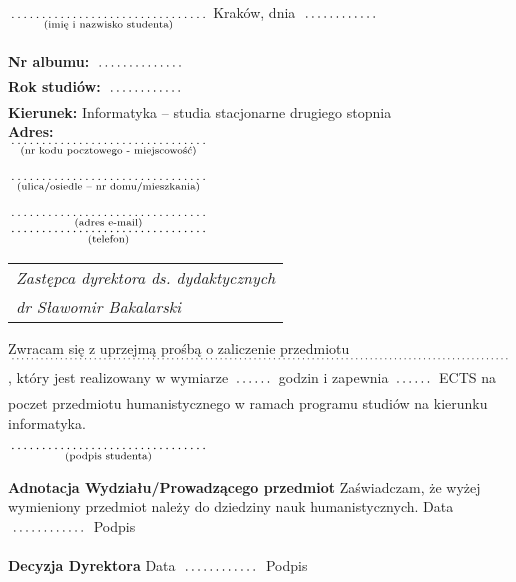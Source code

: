 \documentclass[a4paper,11pt]{article}
\newcommand{\fillField}[2]{
    $\underset{\text{#1}}{\parbox[t]{#2}{\dotfill}}$
}
\begin{document}
\noindent
\fillField{(imię i nazwisko studenta)}{5cm} \hfill Kraków, dnia \fillField{}{2cm} \\\\
\textbf{Nr albumu:}   \fillField{}{2.3cm}\\
\textbf{Rok studiów:} \fillField{}{2cm}\\
\textbf{Kierunek:} Informatyka -- studia stacjonarne drugiego stopnia\\
\textbf{Adres:}\\
\fillField{(nr kodu pocztowego - miejscowość)}{5cm}\\\\
\fillField{(ulica/osiedle – nr domu/mieszkania)}{5cm}\\\\
\fillField{(adres e-mail)}{5cm}\\
\fillField{(telefon)}{5cm}
\phantom{a}\hfill
\begin{tabular}[c]{@{}l@{}}
\textit{Zastępca dyrektora ds. dydaktycznych}\\
\textit{dr Sławomir Bakalarski}
\end{tabular}

\vskip 2.0cm


\noindent
Zwracam się z uprzejmą prośbą o zaliczenie przedmiotu\\
\fillField{}{16cm}, który jest realizowany w wymiarze \fillField{}{1cm} godzin i zapewnia \fillField{}{1cm} ECTS na poczet
przedmiotu humanistycznego w ramach programu studiów na kierunku informatyka.

\vskip 1cm

\hspace{\fill} \fillField{(podpis studenta)}{5cm} \hspace{2.0cm}
\vskip 3.0cm

\noindent
\textbf{Adnotacja Wydziału/Prowadzącego przedmiot} Zaświadczam, że wyżej wymieniony przedmiot należy do dziedziny nauk humanistycznych.
\vskip 0.5cm
\noindent
Data \fillField{}{2cm} Podpis \dotfill


\noindent
\textbf{Decyzja Dyrektora} \dotfill
\vskip 0.5cm
\noindent
Data \fillField{}{2cm} Podpis \dotfill
\end{document}
